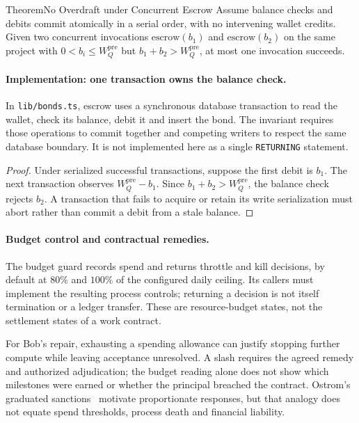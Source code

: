 \documentclass[11pt,a4paper]{article}
\theoremstyle{definition}
\theoremstyle{remark}
\begin{document}
\begin{pdclaim}{Theorem}{No Overdraft under Concurrent Escrow}
\setlength{\parskip}{4pt plus 1pt}
\label{lem:no-overdraft}
Assume balance checks and debits commit atomically in a serial order, with no intervening wallet credits. Given two concurrent invocations $\mathrm{escrow}(b_1)$ and $\mathrm{escrow}(b_2)$ on the same project with $0<b_i \leq W_Q^{\text{pre}}$ but $b_1 + b_2 > W_Q^{\text{pre}}$, at most one invocation succeeds.
\end{pdclaim}

\paragraph{Implementation: one transaction owns the balance check.}
In \texttt{lib/bonds.ts}, escrow uses a synchronous database transaction to
read the wallet, check its balance, debit it and insert the bond. The invariant
requires those operations to commit together and competing writers to respect
the same database boundary. It is not implemented here as a single
\texttt{RETURNING} statement.

\begin{proof}
Under serialized successful transactions, suppose the first debit is $b_1$.
The next transaction observes $W_Q^{\mathrm{pre}}-b_1$. Since
$b_1+b_2>W_Q^{\mathrm{pre}}$, the balance check rejects $b_2$. A transaction
that fails to acquire or retain its write serialization must abort rather
than commit a debit from a stale balance.
\end{proof}

\paragraph{Budget control and contractual remedies.}
The budget guard records spend and returns throttle and kill decisions, by
default at $80\%$ and $100\%$ of the configured daily ceiling. Its callers
must implement the resulting process controls; returning a decision is not
itself termination or a ledger transfer. These are resource-budget states,
not the settlement states of a work contract.

For Bob's repair, exhausting a spending allowance can justify stopping further
compute while leaving acceptance unresolved. A slash requires the agreed
remedy and authorized adjudication; the budget reading alone does not show
which milestones were earned or whether the principal breached the contract.
Ostrom's graduated sanctions~ motivate proportionate
responses, but that analogy does not equate spend thresholds, process death
and financial liability.
\end{document}

